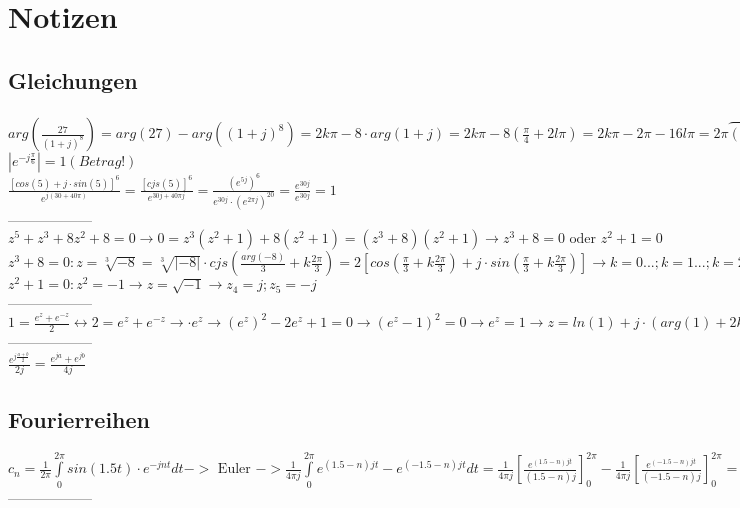 \section{Notizen}
\subsection{Gleichungen}
$arg(\frac{27}{(1+j)^8}) = arg(27) - arg((1+j)^8) = 2k\pi - 8\cdot arg(1+j) = 2k\pi -8(\frac{\pi}{4}+2l\pi) = 2k\pi - 2\pi - 16l\pi = 2\pi\overbrace{(k-8l-1)}^{m} = 2m\pi$\\ \vspace{\baselineskip}
$|e^{-j\frac{\pi}{6}}| = 1 (Betrag!)$\\ \vspace{\baselineskip}
$\frac{[cos(5) + j\cdot sin(5)]^6}{e^{j(30+40\pi)}} = \frac{[cjs(5)]^6}{e^{30j+40\pi j}} = \frac{(e^{5j})^6}{e^{30j}\cdot (e^{2\pi j})^{20}} = \frac{e^{30j}}{e^{30j}} = 1 $\\
------------------\\
$z^5 + z^3 + 8z^2 + 8 = 0 \rightarrow 0 = z^3(z^2 + 1) + 8(z^2 + 1) = (z^3 + 8)(z^2 + 1) \rightarrow z^3 + 8 = 0 \text{ oder }  z^2 + 1 = 0$\\
$z^3 + 8 = 0: z = \sqrt[3]{-8} = \sqrt[3]{|-8|}\cdot cjs(\frac{arg(-8)}{3} + k\frac{2\pi}{3}) = 2[cos(\frac{\pi}{3} + k\frac{2\pi}{3}) + j\cdot sin(\frac{\pi}{3} + k\frac{2\pi}{3})] \rightarrow k = 0 ...; k = 1 ...; k = 2 ...$\\
$z^2+1 = 0 : z^2 = -1 \rightarrow z = \sqrt{-1} \rightarrow z_4 = j; z_5 = -j$\\
------------------\\
$1 = \frac{e^z + e^{-z}}{2} \leftrightarrow 2 = e^z + e^{-z} \rightarrow{\cdot e^z}\rightarrow (e^z)^2 - 2e^z + 1 = 0 \rightarrow (e^z - 1)^2 = 0 \rightarrow e^z = 1 \rightarrow z = ln(1) + j\cdot (arg(1)+2k\pi) = j\cdot 2k\pi$\\
------------------\\
$\frac{e^{j\frac{a+b}{2}}}{2j} = \frac{e^{ja} + e^{jb}}{4j}   $



\subsection{Fourierreihen}
$c_n = \frac{1}{2\pi}\int\limits_{0}^{2\pi} sin(1.5t)\cdot e^{-jnt} dt -> \text{ Euler } -> \frac{1}{4\pi j} \int\limits_{0}^{2\pi} e^{(1.5-n)jt} - e^{(-1.5-n)jt} dt = \frac{1}{4\pi j}[\frac{e^{(1.5-n)jt
}}{(1.5-n)j}]_{0}^{2\pi} - \frac{1}{4\pi j} [\frac{e^{(-1.5-n)jt}}{(-1.5-n)j}]_{0}^{2\pi} = \frac{e^{3\pi j
}\cdot e^{-2\pi nj} -1}{-2(3-2n)\pi} + \frac{e^{-3\pi j} \cdot e^{-2\pi nj} -1}{-2(3+2n)\pi} = \frac{1}{(3-2n)\pi} + \frac{1}{(3+2n)\pi} = \frac{(3+2n) + (3-2n)}{(3-2n)(3+2n)\pi} = \frac{6}{(9-4n^2)\pi}$\\
------------------\\
